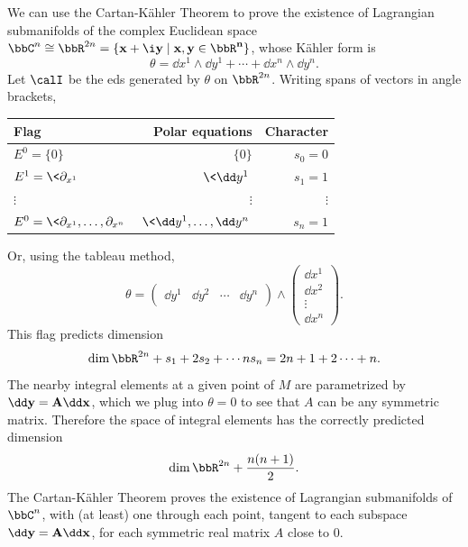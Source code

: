 \begin{example}
    We can use the Cartan-K\"ahler Theorem to prove the existence of Lagrangian submanifolds of the complex Euclidean space $\bbC^n\cong \bbR^{2n}=\{\bf{x}+\i \bf{y}\mid \bf{x},\bf{y}\in\bbR^n\}$, whose K\"ahler form is 
    \[\theta= \dd x^1\wedge \dd y^1+\cdots +\dd x^n\wedge \dd y^n.\]
    Let $\calI$ be the \gls{eds} generated by $\theta$ on $\bbR^{2n}$. Writing spans of vectors in angle brackets, 
    \begin{center}
        \begin{tabular}{l r r} 
         Flag & Polar equations & Character \\ [0.5ex] 
         \hline
         $E^0=\{0\}$ & $\{0\}$ & $s_0=0$ \\ 
         $E^1=\<\partial_{x^1}\>$ & $\<\dd y^1\>$ & $s_1=1$ \\ 
         $\vdots $ & $\vdots $ & $\vdots $ \\ 
         $E^0=\<\partial_{x^1},\ldots,\partial_{x^n}\>$ & $\<\dd y^1,\ldots,\dd y^n\>$ & $s_n=1$ \\ 
         \hline
        \end{tabular}
        \end{center}
        Or, using the tableau method, 
        \[\theta=
            \left(\begin{array}{c|c|c|c}
                \boxed{\dd y^1} & \boxed{\dd y^2} & \cdots &\boxed{\dd y^n}
            \end{array}\right)\wedge 
            \left(\begin{array}{c}
                \dd x^1 \\\hline
                \dd x^2\\ \hline
                \vdots \\ \hline
                \dd x^n
            \end{array}\right).
        \]
        This flag predicts dimension 
        \[\dim \bbR^{2n}+s_1+2s_2+\cdots ns_n=2n+1+2\cdots +n.\]
        The nearby integral elements at a given point of $M$ are parametrized by $\dd \bf{y}=A\dd \bf{x}$, which we plug into $\theta=0$ to see that $A$ can be any symmetric matrix. Therefore the space of integral elements has the correctly predicted dimension
        \[\dim\bbR^{2n}+\frac{n(n+1)}{2}.\]
        The Cartan-K\"ahler Theorem proves the existence of Lagrangian submanifolds of $\bbC^n$, with (at least) one through each point, tangent to each subspace $\dd\bf{y}=A\dd\bf{x}$, for each symmetric real matrix $A$ close to $0$.
\end{example}


